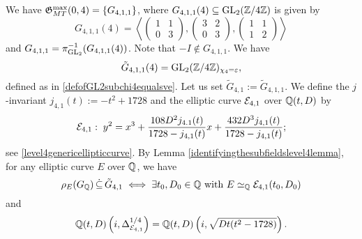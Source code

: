 We have $\mathfrak{G}_{MT}^{\max}(0,4) = \{ G_{4,1,1} \}$, where $G_{4,1,1}(4) \subseteq \operatorname{GL}_2(\mathbb{Z}/4\mathbb{Z})$ is given by
\[
G_{4,1,1}(4) = \left\langle \begin{pmatrix} 1 & 1 \\ 0 & 3 \end{pmatrix}, \begin{pmatrix} 3 & 2 \\ 0 & 3 \end{pmatrix}, \begin{pmatrix} 1 & 1 \\ 1 & 2 \end{pmatrix} \right\rangle
\]
and $G_{4,1,1} = \pi_{\operatorname{GL}_2}^{-1}(G_{4,1,1}(4))$. Note that $-I \notin G_{4,1,1}$. We have 
\[
\tilde{G}_{4,1,1}(4) 
= \operatorname{GL}_2(\mathbb{Z}/4\mathbb{Z})_{\chi_4 = \varepsilon},
\]
defined as in \eqref{defofGL2subchi4equalsve}. Let us set $\tilde{G}_{4,1} := \tilde{G}_{4,1,1}$. We define the $j$-invariant $j_{4,1}(t) := -t^2 + 1728$ and the elliptic curve $\mathcal{E}_{4,1}$ over $\mathbb{Q}(t,D)$ by
\begin{equation*} %
\mc{E}_{4,1} : \; y^2 = x^3 + \frac{108D^2 j_{4.1}(t)}{1728 - j_{4,1}(t)} x + \frac{432D^3 j_{4,1}(t)}{1728 - j_{4,1}(t)};
\end{equation*}
see \eqref{level4genericellipticcurve}. By Lemma \ref{identifyingthesubfieldslevel4lemma}, for any elliptic curve $E$ over $\mathbb{Q}$, we have
\[
\rho_{E}(G_{\mathbb{Q}}) \, \dot\subseteq \, \tilde{G}_{4,1} \; \Longleftrightarrow \; \exists t_0, D_0 \in \mathbb{Q} \text{ with } E \simeq_{\mathbb{Q}} \mathcal{E}_{4,1}(t_0,D_0)
\]
and
\begin{equation} \label{specialformofthedummerextension}
\mathbb{Q}(t,D)\left( i, \Delta_{\mathcal{E}_{4,1}}^{1/4} \right) = \mathbb{Q}(t,D)\left( i, \sqrt{Dt(t^2-1728)} \right).
\end{equation}

